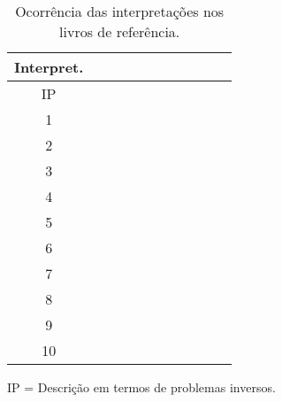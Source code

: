 \begin{table}[H]
\begin{center}
\caption{Ocorrência das interpretações nos livros de referência.}
\label{table:1}
\begin{tabular}{|c|c | c |c|c|c|c|c|c|c|c|} \hline
\rowcolor[gray]{.9} Interpret. & \cite{tarantola2005inverse} & \cite{hansen2010discrete} & \cite{Mueller2012} & \cite{goodfellow2016deep} & \cite{alvarez2017digital} & \cite{aster2019parameter} & \cite{Deisenroth2020} & \cite{Bertero2021} & \cite{Peng2023} & \cite{Vandenbussche2023}\\ \hline
IP & \cellcolor{blue!25} & \cellcolor{blue!25} & \cellcolor{blue!25} & & & \cellcolor{blue!25} & & \cellcolor{blue!25} & & \\ \hline
1 & & & \cellcolor{blue!25}& & & & &\cellcolor{blue!25} & &\\ 
2 & & \cellcolor{blue!25} &\cellcolor{blue!25} & \cellcolor{blue!25}& \cellcolor{blue!25}& \cellcolor{blue!25}& \cellcolor{blue!25}&\cellcolor{blue!25} & & \\ 
3 & & & & \cellcolor{blue!25}& & & \cellcolor{blue!25} & \cellcolor{blue!25} \cellcolor{blue!25} & \cellcolor{blue!25} & \cellcolor{blue!25}\\ 
4 & \cellcolor{blue!25} & & & \cellcolor{blue!25}& \cellcolor{blue!25}& \cellcolor{blue!25}& \cellcolor{blue!25}&\cellcolor{blue!25} & \cellcolor{blue!25} &\\ 
5 & & \cellcolor{blue!25} & \cellcolor{blue!25} & & \cellcolor{blue!25} & \cellcolor{blue!25}& & \cellcolor{blue!25} & &\\ 
6 & \cellcolor{blue!25} & & & & & \cellcolor{blue!25}& & \cellcolor{blue!25} & &\\ 
7 & \cellcolor{blue!25} & \cellcolor{blue!25} & & \cellcolor{blue!25} & \cellcolor{blue!25} & \cellcolor{blue!25} & \cellcolor{blue!25} & \cellcolor{blue!25} & & \\ 
8 & & & & \cellcolor{blue!25}& \cellcolor{blue!25}& & \cellcolor{blue!25}& & \cellcolor{blue!25} & \cellcolor{blue!25}\\ 
9 & & & & \cellcolor{blue!25} &\cellcolor{blue!25} & &\cellcolor{blue!25} & & &\\ 
10 & & & & \cellcolor{blue!25} & & & & & \cellcolor{blue!25} & \\ \hline
\end{tabular}
\end{center}
\end{table}
{ \vspace{-1cm} \footnotesize IP = Descrição em termos de problemas inversos.}

